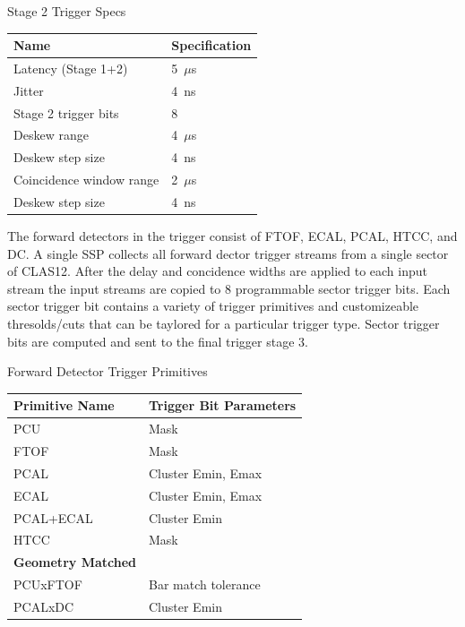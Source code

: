 \begin{center}
	Stage 2 Trigger Specs\\
	\begin{tabular}{| l | l |}
		\hline \hline
		Name				& Specification	\\
		\hline
		Latency (Stage 1+2)		& 5~$\mu$s	\\
		Jitter				& 4~ns		\\
		Stage 2 trigger bits		& 8		\\
		Deskew range			& 4~$\mu$s	\\
		Deskew step size		& 4~ns	\\
		Coincidence window range	& 2~$\mu$s	\\
		Deskew step size		& 4~ns	\\
		\hline \hline
	\end{tabular}
\end{center}

The forward detectors in the trigger consist of FTOF, ECAL, PCAL, HTCC, and DC. A single SSP collects all forward dector trigger streams from a single sector of CLAS12. After the delay and concidence widths are applied to each input stream the input streams are copied to 8 programmable sector trigger bits. Each sector trigger bit contains a variety of trigger primitives and customizeable thresolds/cuts that can be taylored for a particular trigger type. Sector trigger bits are computed and sent to the final trigger stage 3.

\begin{center}
	Forward Detector Trigger Primitives\\
	\begin{tabular}{| l | l |}
		\hline \hline
		Primitive Name			& Trigger Bit Parameters	\\
		\hline
		PCU     			& Mask				\\
		FTOF    			& Mask				\\
		PCAL				& Cluster Emin, Emax		\\
		ECAL				& Cluster Emin, Emax		\\
		PCAL+ECAL			& Cluster Emin			\\
		HTCC				& Mask				\\
		{\bf Geometry Matched}		&				\\
		PCUxFTOF			& Bar match tolerance		\\
		PCALxDC				& Cluster Emin			\\
		\hline \hline
	\end{tabular}
\end{center}

